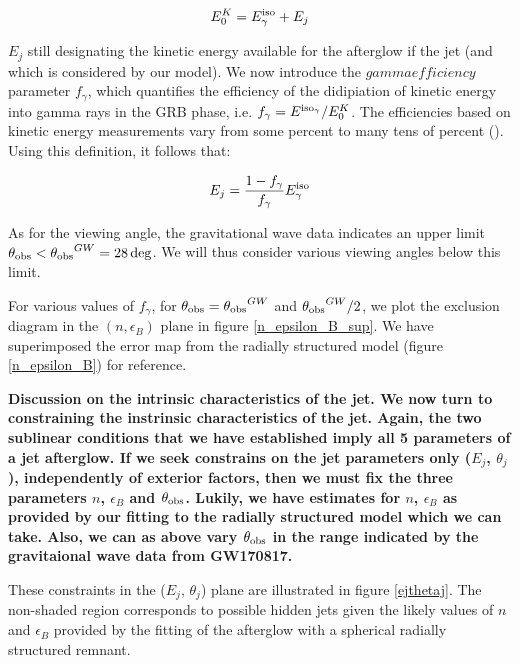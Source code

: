 $$E^K_0 = E^{\rm{iso}}_\gamma + E_j$$

$E_j$ still designating the kinetic energy available for the afterglow if the jet (and which is considered by our model). We now introduce the $gamma efficiency$ parameter $f_\gamma$, which quantifies the efficiency of the didipiation of kinetic energy into gamma rays in the GRB phase, i.e. $f_\gamma = E^{\rm{iso}_\gamma}/E^K_0$. The efficiencies based on kinetic energy measurements vary from some percent to many tens of percent (\cite{47,48}). Using this definition, it follows that:

$$E_j = \frac{1 - f_\gamma}{f_\gamma} E^{\rm{iso}}_\gamma $$

As for the viewing angle, the gravitational wave data indicates an upper limit $\thetaobs < \thetaobs^{GW} = 28\deg$. We will thus consider various viewing angles below this limit.

For various values of $f_\gamma$, for $\thetaobs = \thetaobs^{GW}$ and $\thetaobs^{GW} / 2$, we plot the exclusion diagram in the $(n, \epsilon_B)$ plane in figure \ref{n_epsilon_B_sup}. We have superimposed the error map from the radially structured model (figure \ref{n_epsilon_B}) for reference.
 

\bf{Discussion on the intrinsic characteristics of the jet.} We now turn to constraining the instrinsic characteristics of the jet. Again, the two sublinear conditions that we have established imply all 5 parameters of a jet afterglow. If we seek constrains on the jet parameters only ($E_j$, $\theta_j$), independently of exterior factors, then we must fix the three parameters $n$, $\epsilon_B$ and $\thetaobs$. Lukily, we have estimates for $n$, $\epsilon_B$ as provided by our fitting to the radially structured model which we can take. Also, we can as above vary $\thetaobs$ in the range indicated by the gravitaional wave data from GW170817.

These constraints in the ($E_j$, $\theta_j$) plane are illustrated in figure \ref{ejthetaj}. The non-shaded region corresponds to possible hidden jets given the likely values of $n$ and $\epsilon_B$ provided by the fitting of the afterglow with a spherical radially structured remnant.


